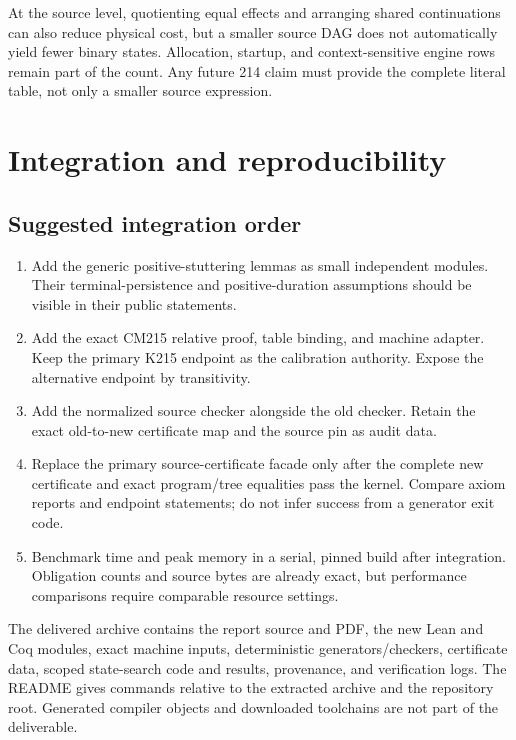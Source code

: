 \documentclass[11pt,letterpaper]{article}
\theoremstyle{definition}\newtheorem{definition}[theorem]{Definition}
\theoremstyle{remark}\newtheorem{remark}[theorem]{Remark}
\begin{document}
At the source level, quotienting equal effects and arranging shared
continuations can also reduce physical cost, but a smaller source DAG
does not automatically yield fewer binary states. Allocation, startup,
and context-sensitive engine rows remain part of the count. Any future
214 claim must provide the complete literal table, not only a smaller
source expression.

\section{Integration and reproducibility}

\subsection{Suggested integration order}

\begin{enumerate}
\item Add the generic positive-stuttering lemmas as small independent
modules. Their terminal-persistence and positive-duration assumptions
should be visible in their public statements.
\item Add the exact CM215 relative proof, table binding, and machine
adapter. Keep the primary K215 endpoint as the calibration authority.
Expose the alternative endpoint by transitivity.
\item Add the normalized source checker alongside the old checker. Retain
the exact old-to-new certificate map and the source pin as audit data.
\item Replace the primary source-certificate facade only after the complete
new certificate and exact program/tree equalities pass the kernel. Compare
axiom reports and endpoint statements; do not infer success from a
generator exit code.
\item Benchmark time and peak memory in a serial, pinned build after
integration. Obligation counts and source bytes are already exact, but
performance comparisons require comparable resource settings.
\end{enumerate}

The delivered archive contains the report source and PDF, the new Lean and
Coq modules, exact machine inputs, deterministic generators/checkers,
certificate data, scoped state-search code and results, provenance, and
verification logs. The README gives commands relative to the extracted
archive and the repository root. Generated compiler objects and downloaded
toolchains are not part of the deliverable.
\end{document}
